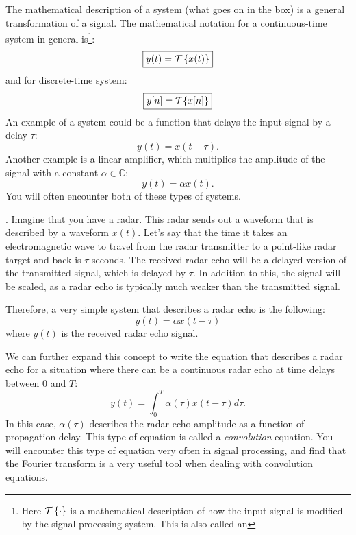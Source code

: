 The mathematical description of a system (what goes on in the box) is a 
general transformation of a signal. The mathematical notation for a 
continuous-time system in general is\footnote{Here $\spop$ is a mathematical 
description of how the input signal is modified by the signal processing system. 
This is also called an
   }:
\begin{equation}
   \boxed{
      y(t) = \spop[x(t)]
   }
\end{equation}
and for discrete-time system:
\begin{equation}
   \boxed{
      y[n] = \spopb\{x[n]\}
   }
\end{equation}
An example of a system could be a function that delays the input
signal by a delay $\tau$:
\begin{equation}
   y(t) = x(t-\tau).
\end{equation}
Another example is a linear amplifier, which multiplies the amplitude
of the signal with a constant $\alpha \in \mathbb{C}$:
\begin{equation}
   y(t) = \alpha x(t).
\end{equation}
You will often encounter both of these types of systems.

. 
Imagine that you have a radar. This radar sends out a waveform that is described by a waveform $x(t)$. 
Let's say that the time it takes an electromagnetic wave to travel from the radar transmitter 
to a point-like radar target and back is $\tau$ seconds. The received radar echo will 
be a delayed version of the transmitted signal, which is delayed by $\tau$. 
In addition to this, the signal will be scaled, as a radar echo is typically much weaker than the transmitted signal.

Therefore, a very simple system that describes a radar echo is the following:
\begin{equation}
   y(t) = \alpha x(t-\tau)
\end{equation}
where $y(t)$ is the received radar echo signal.

We can further expand this concept to write the equation that describes a radar echo 
for a situation where there can be a continuous radar echo at time delays between $0$ and $T$:
\begin{equation}
   y(t) = \int_0^T \alpha(\tau) x(t-\tau) d\tau.
\end{equation}
In this case, $\alpha(\tau)$ describes the radar echo amplitude as a function of propagation delay. 
This type of equation is called a \emph{convolution} equation.
You will encounter this type of equation very often in signal processing, and find that 
the Fourier transform is a very useful tool when dealing with convolution equations.

